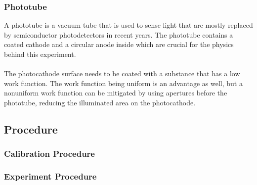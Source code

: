 		\subsubsection{Phototube}
			A phototube is a vacuum tube that is used to sense light that are mostly replaced by semiconductor photodetectors in recent years. The phototube contains a coated cathode and a circular anode inside which are crucial for the physics behind this experiment.
			\\
			\\
			The photocathode surface needs to be coated with a substance that has a low work function. The work function being uniform is an advantage as well, but a nonuniform work function can be mitigated by using apertures before the phototube, reducing the illuminated area on the photocathode. 
	
	\subsection{Procedure}
	
		\subsubsection{Calibration Procedure}
		
		\subsubsection{Experiment Procedure}

